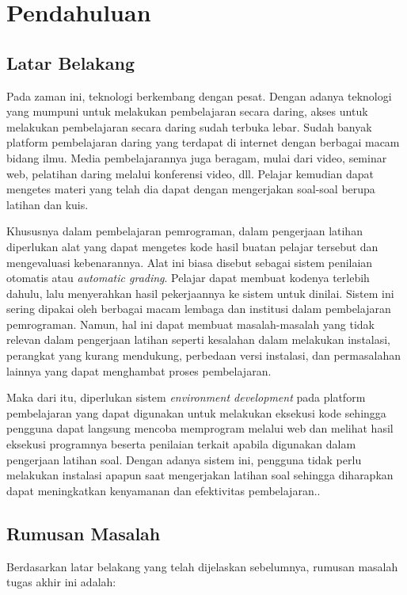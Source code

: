 \chapter{Pendahuluan}

\section{Latar Belakang}
\label{sec:latarbelakang}

Pada zaman ini, teknologi berkembang dengan pesat. Dengan adanya teknologi yang mumpuni untuk melakukan pembelajaran secara daring, akses untuk melakukan pembelajaran secara daring sudah terbuka lebar. Sudah banyak platform pembelajaran daring yang terdapat di internet dengan berbagai macam bidang ilmu. Media pembelajarannya juga beragam, mulai dari video, seminar web, pelatihan daring melalui konferensi video, dll. Pelajar kemudian dapat mengetes materi yang telah dia dapat dengan mengerjakan soal-soal berupa latihan dan kuis.

Khususnya dalam pembelajaran pemrograman, dalam pengerjaan latihan diperlukan alat yang dapat mengetes kode hasil buatan pelajar tersebut dan mengevaluasi kebenarannya. Alat ini biasa disebut sebagai sistem penilaian otomatis atau \textit{automatic grading}. Pelajar dapat membuat kodenya terlebih dahulu, lalu menyerahkan hasil pekerjaannya ke sistem untuk dinilai. Sistem ini sering dipakai oleh berbagai macam lembaga dan institusi dalam pembelajaran pemrograman. Namun, hal ini dapat membuat masalah-masalah yang tidak relevan dalam pengerjaan latihan seperti kesalahan dalam melakukan instalasi, perangkat yang kurang mendukung, perbedaan versi instalasi, dan permasalahan lainnya yang dapat menghambat proses pembelajaran.

Maka dari itu, diperlukan sistem \textit{environment development} pada platform pembelajaran yang dapat digunakan untuk melakukan eksekusi kode sehingga pengguna dapat langsung mencoba memprogram melalui web dan melihat hasil eksekusi programnya beserta penilaian terkait apabila digunakan dalam pengerjaan latihan soal. Dengan adanya sistem ini, pengguna tidak perlu melakukan instalasi apapun saat mengerjakan latihan soal sehingga diharapkan dapat meningkatkan kenyamanan dan efektivitas pembelajaran..


\section{Rumusan Masalah}
Berdasarkan latar belakang yang telah dijelaskan sebelumnya, rumusan masalah tugas akhir ini adalah:


